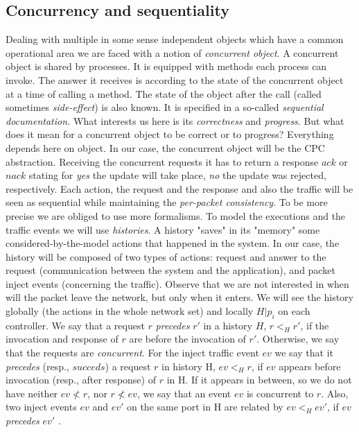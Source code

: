 \documentclass{article}
\theoremstyle{remark}
\begin{document}
\subsection{Concurrency and sequentiality}
Dealing with multiple in some sense independent objects which have a common operational area we are faced with a notion of \emph{concurrent object}. A concurrent object is shared by processes. It is equipped with methods each process can invoke. The answer it receives is according to the state of the concurrent object at a time of calling a method. The state of the object after the call (called sometimes \emph{side-effect}) is also known. It is specified in a so-called \emph{sequential documentation.} What interests us here is its \emph{correctness} and \emph{progress}. But what does it mean for a concurrent object to be correct or to progress? Everything depends here on object.
In our case, the concurrent object will be the CPC abstraction. Receiving the concurrent requests it has to return a response $ack$ or $nack$ stating for \emph{yes} the update will take place, \emph{no} the update was rejected, respectively. Each action, the request and the response and also the traffic will be seen as sequential while maintaining the \emph{per-packet consistency}.
To be more precise we are obliged to use more formalisms.
To model the executions and the traffic events we will use \emph{histories}. A history "saves" in its "memory" some considered-by-the-model actions that happened in the system. In our case, the history will be composed of two types of actions: request and  answer to the request (communication between the system and the application), and packet inject events (concerning the traffic). Observe that we are not interested in when will the packet leave the network, but only when it enters.
We will see the history globally (the actions in the whole network set) and locally $H|p_i$ on each controller.
We say that a request $r$ \emph{precedes} $r'$ in a history $H$, $r<_Hr'$, if the invocation and response of $r$ are before the invocation of $r'$. Otherwise, we say that the requests are \emph{concurrent}. For the inject traffic event $ev$ we say that it \emph{precedes} (resp., $succeds$) a request $r$ in history H, $ev<_H r$, if $ev$ appears before invocation (resp., after response)  of $r$ in H. If it appears in between, so we do not have neither $ev\nless r$, nor $r\nless ev$, we say that an event $ev$ is concurrent to $r$. Also, two inject events $ev$ and $ev'$ on the same port in H are related by $ev<_Hev'$, if $ev$ \emph{precedes} $ev'$ \cite{CKLS15}.
\end{document}
